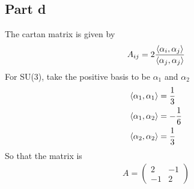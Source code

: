 \documentclass[a4paper,12pt]{article}
\begin{document}
\subsection*{Part d}
The cartan matrix is given by
\begin{equation}
	\begin{aligned}
		A_{ij}=2\frac{\expval{\alpha_i,\alpha_j}}{\expval{\alpha_j,\alpha_j}}
	\end{aligned}
\end{equation}
For SU(3), take the positive basis to be $\alpha_1$ and $\alpha_2$
\begin{equation}
	\begin{aligned}
		\expval{\alpha_1,\alpha_1}&=\frac{1}{3}\\
		\expval{\alpha_1,\alpha_2}&=-\frac{1}{6}\\
		\expval{\alpha_2,\alpha_2}&=\frac{1}{3}\\
	\end{aligned}
\end{equation}
So that the matrix is
\begin{equation}
	\begin{aligned}
		A=\begin{pmatrix}
			2 & -1 \\
			-1 & 2
		\end{pmatrix}
	\end{aligned}
\end{equation}
\end{document}
